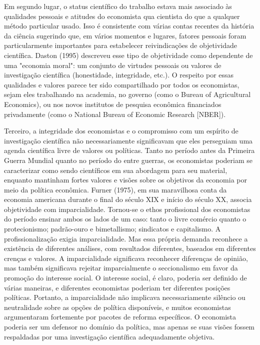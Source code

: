 \documentclass[12pt]{article}
\begin{document}
Em segundo lugar, o status científico do trabalho estava mais associado às qualidades pessoais e atitudes do economista qua cientista do que a qualquer método particular usado. Isso é consistente com várias contas recentes da história da ciência sugerindo que, em vários momentos e lugares, fatores pessoais foram particularmente importantes para estabelecer reivindicações de objetividade científica. Daston (1995) descreveu esse tipo de objetividade como dependente de uma "economia moral": um conjunto de virtudes pessoais ou valores de investigação científica (honestidade, integridade, etc.). O respeito por essas qualidades e valores parece ter sido compartilhado por todos os economistas, sejam eles trabalhando na academia, no governo (como o Bureau of Agricultural Economics), ou nos novos institutos de pesquisa econômica financiados privadamente (como o National Bureau of Economic Research [NBER]).

Terceiro, a integridade dos economistas e o compromisso com um espírito de investigação científica não necessariamente significavam que eles perseguiam uma agenda científica livre de valores ou políticas. Tanto no período antes da Primeira Guerra Mundial quanto no período do entre guerras, os economistas poderiam se caracterizar como sendo científicos em sua abordagem para seu material, enquanto mantinham fortes valores e visões sobre os objetivos da economia por meio da política econômica. Furner (1975), em sua maravilhosa conta da economia americana durante o final do século XIX e início do século XX, associa objetividade com imparcialidade. Tornou-se o ethos profissional dos economistas do período ensinar ambos os lados de um caso: tanto o livre comércio quanto o protecionismo; padrão-ouro e bimetallismo; sindicatos e capitalismo. A profissionalização exigia imparcialidade. Mas essa própria demanda reconhece a existência de diferentes análises, com resultados diferentes, baseados em diferentes crenças e valores. A imparcialidade significava reconhecer diferenças de opinião, mas também significava rejeitar imparcialmente o seccionalismo em favor da promoção do interesse social. O interesse social, é claro, poderia ser definido de várias maneiras, e diferentes economistas poderiam ter diferentes posições políticas. Portanto, a imparcialidade não implicava necessariamente silêncio ou neutralidade sobre as opções de política disponíveis, e muitos economistas argumentaram fortemente por pacotes de reforma específicos. O economista poderia ser um defensor no domínio da política, mas apenas se suas visões fossem respaldadas por uma investigação científica adequadamente objetiva.
\end{document}
